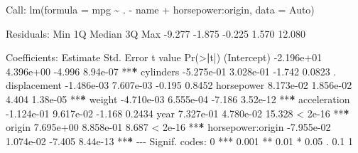 \documentclass[
]{article}
\newenvironment{Shaded}{\begin{snugshade}}{\end{snugshade}}
\newcommand{\AttributeTok}[1]{\textcolor[rgb]{0.77,0.63,0.00}{#1}}
\newcommand{\DecValTok}[1]{\textcolor[rgb]{0.00,0.00,0.81}{#1}}
\newcommand{\ErrorTok}[1]{\textcolor[rgb]{0.64,0.00,0.00}{\textbf{#1}}}
\newcommand{\FloatTok}[1]{\textcolor[rgb]{0.00,0.00,0.81}{#1}}
\newcommand{\FunctionTok}[1]{\textcolor[rgb]{0.00,0.00,0.00}{#1}}
\newcommand{\NormalTok}[1]{#1}
\newcommand{\SpecialCharTok}[1]{\textcolor[rgb]{0.00,0.00,0.00}{#1}}
\newcommand{\StringTok}[1]{\textcolor[rgb]{0.31,0.60,0.02}{#1}}
\begin{document}
\begin{Shaded}
\begin{Highlighting}[]
\NormalTok{Call}\SpecialCharTok{:}
\FunctionTok{lm}\NormalTok{(}\AttributeTok{formula =}\NormalTok{ mpg }\SpecialCharTok{\textasciitilde{}}\NormalTok{ . }\SpecialCharTok{{-}}\NormalTok{ name }\SpecialCharTok{+}\NormalTok{ horsepower}\SpecialCharTok{:}\NormalTok{origin, }\AttributeTok{data =}\NormalTok{ Auto)}

\NormalTok{Residuals}\SpecialCharTok{:}
\NormalTok{   Min     1Q Median     3Q    Max }
\SpecialCharTok{{-}}\FloatTok{9.277} \SpecialCharTok{{-}}\FloatTok{1.875} \SpecialCharTok{{-}}\FloatTok{0.225}  \FloatTok{1.570} \FloatTok{12.080} 

\NormalTok{Coefficients}\SpecialCharTok{:}
\NormalTok{                    Estimate Std. Error t value }\FunctionTok{Pr}\NormalTok{(}\SpecialCharTok{\textgreater{}}\ErrorTok{|}\NormalTok{t}\SpecialCharTok{|}\NormalTok{)    }
\NormalTok{(Intercept)       }\SpecialCharTok{{-}}\FloatTok{2.196e+01}  \FloatTok{4.396e+00}  \SpecialCharTok{{-}}\FloatTok{4.996} \FloatTok{8.94e{-}07} \SpecialCharTok{**}\ErrorTok{*}
\NormalTok{cylinders         }\SpecialCharTok{{-}}\FloatTok{5.275e{-}01}  \FloatTok{3.028e{-}01}  \SpecialCharTok{{-}}\FloatTok{1.742}   \FloatTok{0.0823}\NormalTok{ .  }
\NormalTok{displacement      }\SpecialCharTok{{-}}\FloatTok{1.486e{-}03}  \FloatTok{7.607e{-}03}  \SpecialCharTok{{-}}\FloatTok{0.195}   \FloatTok{0.8452}    
\NormalTok{horsepower         }\FloatTok{8.173e{-}02}  \FloatTok{1.856e{-}02}   \FloatTok{4.404} \FloatTok{1.38e{-}05} \SpecialCharTok{**}\ErrorTok{*}
\NormalTok{weight            }\SpecialCharTok{{-}}\FloatTok{4.710e{-}03}  \FloatTok{6.555e{-}04}  \SpecialCharTok{{-}}\FloatTok{7.186} \FloatTok{3.52e{-}12} \SpecialCharTok{**}\ErrorTok{*}
\NormalTok{acceleration      }\SpecialCharTok{{-}}\FloatTok{1.124e{-}01}  \FloatTok{9.617e{-}02}  \SpecialCharTok{{-}}\FloatTok{1.168}   \FloatTok{0.2434}    
\NormalTok{year               }\FloatTok{7.327e{-}01}  \FloatTok{4.780e{-}02}  \FloatTok{15.328}  \SpecialCharTok{\textless{}} \FloatTok{2e{-}16} \SpecialCharTok{**}\ErrorTok{*}
\NormalTok{origin             }\FloatTok{7.695e+00}  \FloatTok{8.858e{-}01}   \FloatTok{8.687}  \SpecialCharTok{\textless{}} \FloatTok{2e{-}16} \SpecialCharTok{**}\ErrorTok{*}
\NormalTok{horsepower}\SpecialCharTok{:}\NormalTok{origin }\SpecialCharTok{{-}}\FloatTok{7.955e{-}02}  \FloatTok{1.074e{-}02}  \SpecialCharTok{{-}}\FloatTok{7.405} \FloatTok{8.44e{-}13} \SpecialCharTok{**}\ErrorTok{*}
\SpecialCharTok{{-}{-}{-}}
\NormalTok{Signif. codes}\SpecialCharTok{:}  \DecValTok{0} \StringTok{\textquotesingle{}***\textquotesingle{}} \FloatTok{0.001} \StringTok{\textquotesingle{}**\textquotesingle{}} \FloatTok{0.01} \StringTok{\textquotesingle{}*\textquotesingle{}} \FloatTok{0.05} \StringTok{\textquotesingle{}.\textquotesingle{}} \FloatTok{0.1} \StringTok{\textquotesingle{} \textquotesingle{}} \DecValTok{1}


\end{Highlighting}
\end{Shaded}
\end{document}
